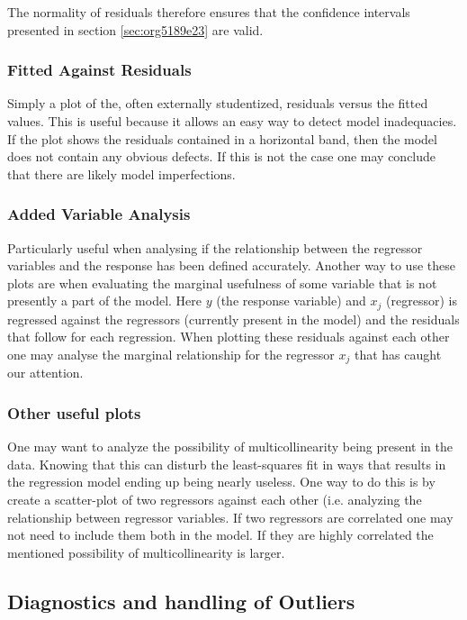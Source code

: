 \documentclass[11pt]{article}
\begin{document}
The normality of residuals therefore ensures that the confidence intervals presented in section \ref{sec:org5189e23}
are valid.

\subsubsection{Fitted Against Residuals}
\label{sec:org9eed1d9}

Simply a plot of the, often externally studentized, residuals versus the fitted values. This is useful
because it allows an easy way to detect model inadequacies. If the plot shows the residuals contained in
a horizontal band, then the model does not contain any obvious defects. If this is not the case one may
conclude that there are likely model imperfections.

\subsubsection{Added Variable Analysis}
\label{sec:org3888b51}

Particularly useful when analysing if the relationship between the regressor variables and the response
has been defined accurately. Another way to use these plots are when evaluating the marginal usefulness
of some variable that is not presently a part of the model. Here \(y\) (the response variable) and \(x_j\)
(regressor) is regressed against the regressors (currently present in the model) and the residuals that
follow for each regression. When plotting these residuals against each other one may analyse the marginal
relationship for the regressor \(x_j\) that has caught our attention.

\subsubsection{Other useful plots}
\label{sec:org66261b2}

One may want to analyze the possibility of multicollinearity being present in the data. Knowing that
this can disturb the least-squares fit in ways that results in the regression model ending up being
nearly useless. One way to do this is by create a scatter-plot of two regressors against each other
(i.e. analyzing the relationship between regressor variables. If two regressors are correlated one 
may not need to include them both in the model. If they are highly correlated the mentioned possibility 
of multicollinearity is larger. 

\subsection{Diagnostics and handling of Outliers}
\label{sec:orgd16dd4a}
\end{document}
